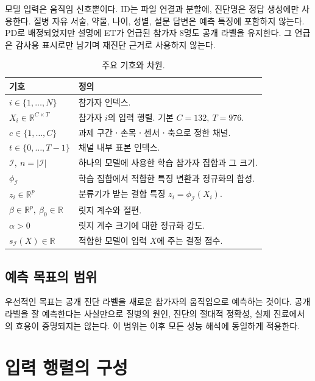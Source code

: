 \documentclass[11pt,a4paper]{article}
\newcommand{\R}{\mathbb{R}}
\numberwithin{equation}{section}
\begin{document}
모델 입력은 움직임 신호뿐이다.
ID는 파일 연결과 분할에, 진단명은 정답 생성에만 사용한다.
질병 자유 서술, 약물, 나이, 성별, 설문 답변은 예측 특징에 포함하지 않는다.
PD로 배정되었지만 설명에 ET가 언급된 참가자 8명도 공개 라벨을 유지한다.
그 언급은 감사용 표시로만 남기며 재진단 근거로 사용하지 않는다.

\begin{table}[H]
\centering\small
\caption{주요 기호와 차원.}\label{tab:notation}
\begin{tabularx}{\linewidth}{@{}lX@{}}
\toprule 기호 & 정의\\ \midrule
\(i\in\{1,\ldots,N\}\) & 참가자 인덱스.\\
\(X_i\in\R^{C\times T}\) & 참가자 \(i\)의 입력 행렬. 기본 \(C=132,\ T=976\).\\
\(c\in\{1,\ldots,C\}\) & 과제 구간ㆍ손목ㆍ센서ㆍ축으로 정한 채널.\\
\(t\in\{0,\ldots,T-1\}\) & 채널 내부 표본 인덱스.\\
\(\mathcal I,\ n=|\mathcal I|\) & 하나의 모델에 사용한 학습 참가자 집합과 그 크기.\\
\(\phi_{\mathcal I}\) & 학습 집합에서 적합한 특징 변환과 정규화의 합성.\\
\(z_i\in\R^p\) & 분류기가 받는 결합 특징 \(z_i=\phi_{\mathcal I}(X_i)\).\\
\(\beta\in\R^p,\ \beta_0\in\R\) & 릿지 계수와 절편.\\
\(\alpha>0\) & 릿지 계수 크기에 대한 정규화 강도.\\
\(s_{\mathcal I}(X)\in\R\) & 적합한 모델이 입력 \(X\)에 주는 결정 점수.\\
\bottomrule
\end{tabularx}
\end{table}

\subsection{예측 목표의 범위}
우선적인 목표는 공개 진단 라벨을 새로운 참가자의 움직임으로 예측하는 것이다.
공개 라벨을 잘 예측한다는 사실만으로 질병의 원인, 진단의 절대적 정확성,
실제 진료에서의 효용이 증명되지는 않는다.
이 범위는 이후 모든 성능 해석에 동일하게 적용한다.

\section{입력 행렬의 구성}
\end{document}
